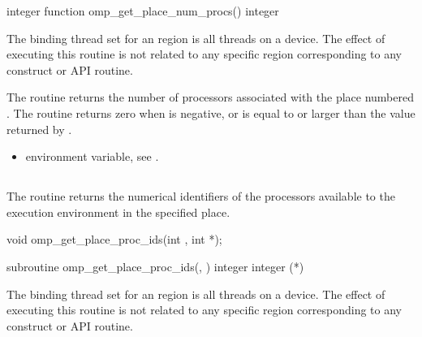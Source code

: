 \begin{fortranspecific}
\begin{ompfFunction}
integer function omp_get_place_num_procs()
integer 
\end{ompfFunction}
\end{fortranspecific}

\binding
The binding thread set for an   region is all threads on a device. The effect of executing this routine is not related to any specific region corresponding to any construct or API routine.

\effect
The  routine returns the number of
processors associated with the place numbered . The
routine returns zero when  is negative, or is equal
to or larger than the value returned by .

\crossreferences
\begin{itemize}
\item {} environment variable, see
.
\end{itemize}




\subsection{}
\label{subsec:omp_get_place_proc_ids}

\summary
The  routine returns the numerical identifiers of the processors available to the execution environment in the specified place.

\format
\begin{ccppspecific}
\begin{ompcFunction}
void omp_get_place_proc_ids(int , int *);
\end{ompcFunction}
\end{ccppspecific}

\begin{fortranspecific}
\begin{ompfSubroutine}
subroutine omp_get_place_proc_ids(, )
integer 
integer (*)
\end{ompfSubroutine}
\end{fortranspecific}

\binding
The binding thread set for an  region is all
threads on a device. The effect of executing this routine is not related to
any specific region corresponding to any construct or API routine.

